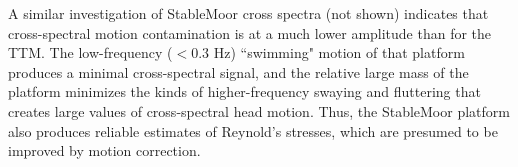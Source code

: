 A similar investigation of StableMoor cross spectra (not shown) indicates that cross-spectral motion contamination is at a much lower amplitude than for the TTM. The low-frequency ($<0.3$ Hz) ``swimming" motion of that platform produces a minimal cross-spectral signal, and the relative large mass of the platform minimizes the kinds of higher-frequency swaying and fluttering that creates large values of cross-spectral head motion. Thus, the StableMoor platform also produces reliable estimates of Reynold's stresses, which are presumed to be improved by motion correction.





